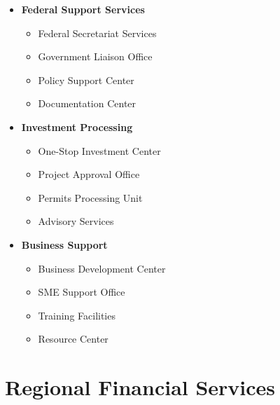 \begin{tcolorbox}[
    colback=white,
    colframe=primarydark,
    title=\textbf{Abuja Region},
    before skip=1em,
    after skip=1em
]
    \begin{itemize}[leftmargin=*,itemsep=0.5em]
        \item \textbf{Federal Support Services}
        \begin{itemize}[itemsep=0.3em]
            \item Federal Secretariat Services
            \item Government Liaison Office
            \item Policy Support Center
            \item Documentation Center
        \end{itemize}

        \vspace{0.5em}

        \item \textbf{Investment Processing}
        \begin{itemize}[itemsep=0.3em]
            \item One-Stop Investment Center
            \item Project Approval Office
            \item Permits Processing Unit
            \item Advisory Services
        \end{itemize}

        \vspace{0.5em}

        \item \textbf{Business Support}
        \begin{itemize}[itemsep=0.3em]
            \item Business Development Center
            \item SME Support Office
            \item Training Facilities
            \item Resource Center
        \end{itemize}
    \end{itemize}
\end{tcolorbox}


\section{Regional Financial Services}\label{sec:regional-financial-services}
\vspace{1em}

